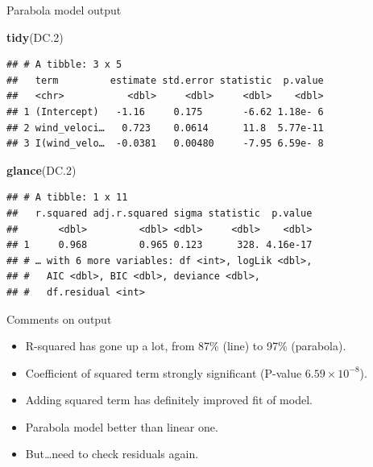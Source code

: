 \documentclass[ignorenonframetext,]{beamer}
\newenvironment{Shaded}{\begin{snugshade}}{\end{snugshade}}
\newcommand{\FloatTok}[1]{\textcolor[rgb]{0.00,0.00,0.81}{#1}}
\newcommand{\KeywordTok}[1]{\textcolor[rgb]{0.13,0.29,0.53}{\textbf{#1}}}
\newcommand{\NormalTok}[1]{#1}
\providecommand{\tightlist}{%
  \setlength{\itemsep}{0pt}\setlength{\parskip}{0pt}}
\begin{document}
\begin{frame}[fragile]{Parabola model output}
\protect\hypertarget{parabola-model-output}{}

\begin{Shaded}
\begin{Highlighting}[]
\KeywordTok{tidy}\NormalTok{(DC}\FloatTok{.2}\NormalTok{)}
\end{Highlighting}
\end{Shaded}

\begin{verbatim}
## # A tibble: 3 x 5
##   term         estimate std.error statistic  p.value
##   <chr>           <dbl>     <dbl>     <dbl>    <dbl>
## 1 (Intercept)   -1.16     0.175       -6.62 1.18e- 6
## 2 wind_veloci…   0.723    0.0614      11.8  5.77e-11
## 3 I(wind_velo…  -0.0381   0.00480     -7.95 6.59e- 8
\end{verbatim}

\begin{Shaded}
\begin{Highlighting}[]
\KeywordTok{glance}\NormalTok{(DC}\FloatTok{.2}\NormalTok{)}
\end{Highlighting}
\end{Shaded}

\begin{verbatim}
## # A tibble: 1 x 11
##   r.squared adj.r.squared sigma statistic  p.value
##       <dbl>         <dbl> <dbl>     <dbl>    <dbl>
## 1     0.968         0.965 0.123      328. 4.16e-17
## # … with 6 more variables: df <int>, logLik <dbl>,
## #   AIC <dbl>, BIC <dbl>, deviance <dbl>,
## #   df.residual <int>
\end{verbatim}

\end{frame}

\begin{frame}{Comments on output}
\protect\hypertarget{comments-on-output}{}

\begin{itemize}
\tightlist
\item
  R-squared has gone up a lot, from 87\% (line) to 97\% (parabola).
\item
  Coefficient of squared term strongly significant (P-value
  \(6.59 \times 10^{−8}\)).
\item
  Adding squared term has definitely improved fit of model.
\item
  Parabola model better than linear one.
\item
  But\ldots{}need to check residuals again.
\end{itemize}

\end{frame}
\end{document}
